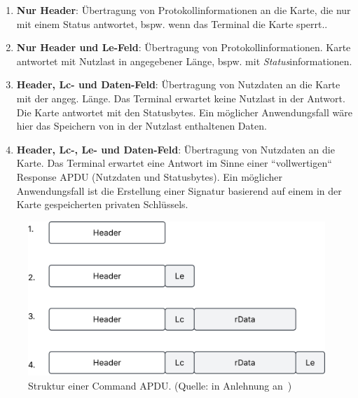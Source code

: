 \begin{enumerate}
    \itemsep0.5em
    \item \textbf{Nur Header}: Übertragung von Protokollinformationen an die Karte, die nur mit einem Status antwortet, bspw. wenn das Terminal die Karte sperrt..
    \item \textbf{Nur Header und Le-Feld}: Übertragung von Protokollinformationen.
    Karte antwortet mit Nutzlast in angegebener Länge, bspw. mit \textit{Status}informationen.
    \item \textbf{Header, Lc- und Daten-Feld}: Übertragung von Nutzdaten an die Karte mit der angeg. Länge. Das Terminal erwartet keine Nutzlast in der Antwort. Die Karte antwortet mit den Statusbytes. Ein möglicher Anwendungsfall wäre hier das Speichern von in der Nutzlast enthaltenen Daten.
    \item \textbf{Header, Lc-, Le- und Daten-Feld}: Übertragung von Nutzdaten an die Karte. Das Terminal erwartet eine Antwort im Sinne einer ``vollwertigen`` Response APDU (Nutzdaten und Statusbytes). Ein möglicher Anwendungsfall ist die Erstellung einer Signatur basierend auf einem in der Karte gespeicherten privaten Schlüssels.
\end{enumerate}



\begin{figure}
    \centering
    \includegraphics[scale=0.4]{aufgabe 1/img/cases.svg}
    \caption{Struktur einer Command APDU. (Quelle: in Anlehnung an~\cite[\textbf{Bild 6.41}, 431]{RE02})}
    \label{fig:cases}
\end{figure}
